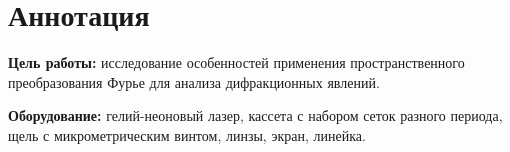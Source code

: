 \section{Аннотация}
\textbf{Цель работы:} исследование особенностей применения пространственного преобразования Фурье для анализа дифракционных явлений.

\textbf{Оборудование:} гелий-неоновый лазер, кассета с набором сеток разного периода, щель с микрометрическим винтом, линзы, экран, линейка.
